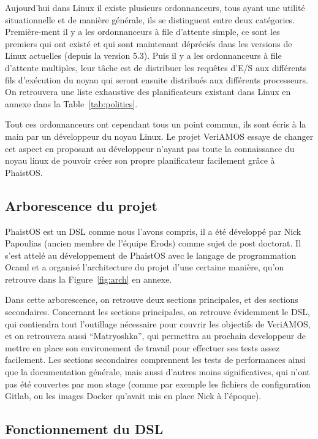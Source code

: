 Aujourd'hui dans Linux il existe plusieurs ordonnanceurs, tous ayant une 
utilité situationnelle et de manière générale, ils se distinguent entre deux 
catégories. Première-ment il y a les ordonnanceurs à file d'attente simple, ce 
sont les premiers qui ont existé et qui sont maintenant dépréciés dans les 
versions de Linux actuelles (depuis la version 5.3). Puis il y a les 
ordonnanceurs à file d'attente multiples, leur tâche est de distribuer les 
requêtes d'E/S aux différents fils d'exécution du noyau qui seront ensuite 
distribués aux différents processeurs. On retrouvera une liste exhaustive des 
planificateurs existant dans Linux en annexe dans la Table~\ref{tab:politics}.

Tout ces ordonnanceurs ont cependant tous un point commun, ils sont écris à la 
main par un développeur du noyau Linux. Le projet VeriAMOS essaye de changer 
cet aspect en proposant au développeur n'ayant pas toute la connaissance du 
noyau linux de pouvoir créer son propre planificateur facilement grâce à 
PhaistOS. 

\subsection{Arborescence du projet}

PhaistOS est un DSL comme nous l'avons compris, il a été développé par Nick 
Papoulias (ancien membre de l'équipe Erods) comme sujet de post doctorat. Il 
s'est attelé au développement de PhaistOS avec le langage de programmation 
Ocaml et a organisé l'architecture du projet d'une certaine manière, qu'on 
retrouve dans la Figure~\ref{fig:arch} en annexe.

Dans cette arborescence, on retrouve deux sections principales, et des sections 
secondaires. Concernant les sections principales, on retrouve évidemment le 
DSL, qui contiendra tout l'outillage nécessaire pour couvrir les objectifs de 
VeriAMOS, et on retrouvera aussi ``Matryoshka'', qui permettra au prochain 
developpeur de mettre en place son environement de travail pour effectuer ses 
tests assez facilement. Les sections secondaires comprennent les tests de 
performances ainsi que la documentation générale, mais aussi d'autres moins 
significatives, qui n'ont pas été couvertes par mon stage (comme par exemple 
les fichiers de configuration Gitlab, ou les images Docker qu'avait mis en 
place Nick à l'époque).

\subsection{Fonctionnement du DSL}

